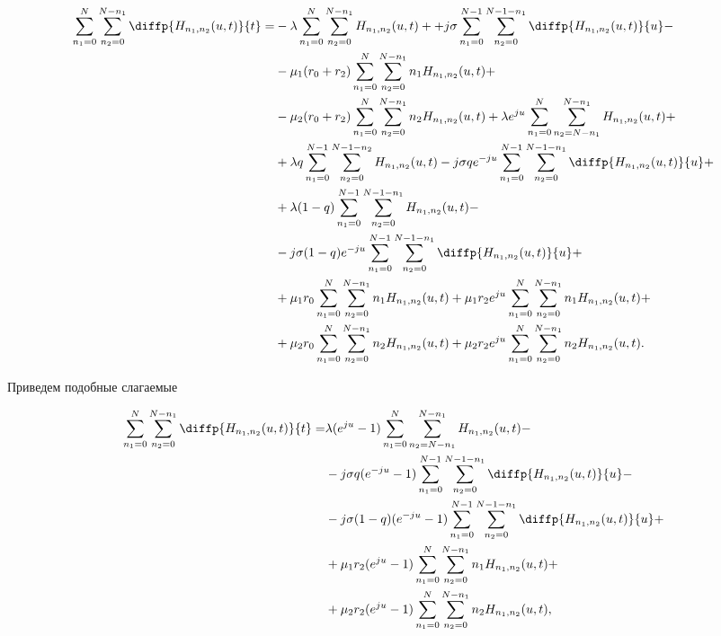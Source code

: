 \begin{equation*}
\begin{aligned}
	\sum_{n_1=0}^N\sum_{n_2=0}^{N-n_1} \diffp{H_{n_1,n_2}(u,t)}{t}=
	&-\lambda \sum_{n_1=0}^N\sum_{n_2=0}^{N-n_1} H_{n_1, n_2}(u,t)+
	 +j\sigma \sum_{n_1=0}^{N-1}\sum_{n_2=0}^{N-1-n_1} 
	 \diffp{H_{n_1, n_2}(u,t)}{u}-\\
	&-\mu_1 (r_0+r_2) \sum_{n_1=0}^N\sum_{n_2=0}^{N-n_1} n_1 H_{n_1, n_2}(u,t)+\\
	&-\mu_2 (r_0+r_2)\sum_{n_1=0}^N\sum_{n_2=0}^{N-n_1} n_2 H_{n_1, n_2}(u,t)+\lambda e^{ju}\sum_{n_1=0}^N\sum_{n_2=N-n_1}^{N-n_1} 
	  H_{n_1, n_2}(u,t)+\\
	&+\lambda q \sum_{n_1=0}^{N-1}\sum_{n_2=0}^{N-1-n_2} 
	  H_{n_1, n_2}(u,t)
	 -j \sigma q e^{-ju} \sum_{n_1=0}^{N-1}\sum_{n_2=0}^{N-1-n_1} 
	   \diffp{H_{n_1, n_2}(u,t)}{u}+\\
	&+\lambda (1-q) \sum_{n_1=0}^{N-1}\sum_{n_2=0}^{N-1-n_1} 
	  H_{n_1, n_2}(u,t)-\\
	  &-j \sigma (1-q) e^{-ju}\sum_{n_1=0}^{N-1}\sum_{n_2=0}^{N-1-n_1} 
	  \diffp{H_{n_1, n_2}(u,t)}{u}+\\
	&+\mu_1 r_0 \sum_{n_1=0}^N\sum_{n_2=0}^{N-n_1} 
	  n_1 H_{n_1, n_2}(u,t)
	+\mu_1 r_2 e^{ju}\sum_{n_1=0}^{N}\sum_{n_2=0}^{N-n_1} 
	  n_1 H_{n_1, n_2}(u,t)+\\
	&+\mu_2 r_0 \sum_{n_1=0}^N\sum_{n_2=0}^{N-n_1} 
	  n_2 H_{n_1, n_2}(u,t)
	 +\mu_2 r_2 e^{ju}\sum_{n_1=0}^{N}\sum_{n_2=0}^{N-n_1} 
	  n_2 H_{n_1, n_2}(u,t).\\
\end{aligned}
\end{equation*}

Приведем подобные слагаемые 

\begin{equation*}
\begin{aligned}
	\sum_{n_1=0}^N\sum_{n_2=0}^{N-n_1} \diffp{H_{n_1,n_2}(u,t)}{t}=
	&\lambda (e^{ju} - 1)\sum_{n_1=0}^N\sum_{n_2=N-n_1}^{N-n_1} 
	  H_{n_1, n_2}(u,t)-\\
	&-j \sigma q (e^{-ju}-1) \sum_{n_1=0}^{N-1}\sum_{n_2=0}^{N-1-n_1} 
	   \diffp{H_{n_1, n_2}(u,t)}{u}-\\
	&-j \sigma (1-q) (e^{-ju}-1)\sum_{n_1=0}^{N-1}\sum_{n_2=0}^{N-1-n_1} 
	  \diffp{H_{n_1, n_2}(u,t)}{u}+\\
	&+\mu_1 r_2 (e^{ju} -1)\sum_{n_1=0}^{N}\sum_{n_2=0}^{N-n_1} 
	n_1 H_{n_1, n_2}(u,t)+\\
	&+\mu_2 r_2 (e^{ju} -1)\sum_{n_1=0}^{N}\sum_{n_2=0}^{N-n_1} 
	n_2 H_{n_1, n_2}(u,t),\\
\end{aligned}
\end{equation*}

